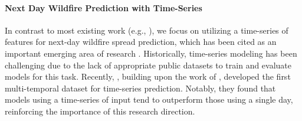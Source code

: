 \paragraph{Next Day Wildfire Prediction with Time-Series} In contrast to most existing work (e.g., \cite{li2024wildfire, fitzgerald2023paying, shah2023wildfire, xiao2024wildfire}), we focus on utilizing a time-series of features for next-day wildfire spread prediction, which has been cited as an important emerging area of research \cite{fitzgerald2023paying, gerard2023wildfirespreadts, li2024wildfire}.  Historically, time-series modeling has been challenging due to the lack of appropriate public datasets to train and evaluate models for this task. Recently, \cite{gerard2023wildfirespreadts}, building upon the work of \cite{huot2022next}, developed the first multi-temporal dataset for time-series prediction.  Notably, they found that models using a time-series of input tend to outperform those using a single day, reinforcing the importance of this research direction. %